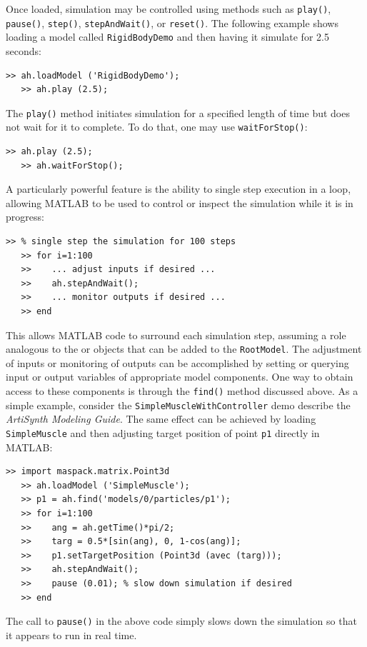 \documentclass{article}
\begin{document}
Once loaded, simulation may be controlled using methods such as {\tt play()},
{\tt pause()}, {\tt step()}, {\tt stepAndWait()}, or {\tt reset()}. The
following example shows loading a model called {\tt RigidBodyDemo} and then
having it simulate for 2.5 seconds:
%
\begin{lstlisting}[]
   >> ah.loadModel ('RigidBodyDemo');
   >> ah.play (2.5);
\end{lstlisting}
%
The {\tt play()} method initiates simulation for a specified length of time but
does not wait for it to complete. To do that, one may use {\tt waitForStop()}:
%
\begin{lstlisting}[]
   >> ah.play (2.5);
   >> ah.waitForStop();
\end{lstlisting}
%
A particularly powerful feature is the ability to single step
execution in a loop, allowing MATLAB to be used to control or inspect
the simulation while it is in progress:
%
\begin{lstlisting}[]
   >> % single step the simulation for 100 steps
   >> for i=1:100
   >>    ... adjust inputs if desired ...
   >>    ah.stepAndWait();
   >>    ... monitor outputs if desired ...
   >> end
\end{lstlisting}
%
This allows MATLAB code to surround each simulation step, assuming a
role analogous to the 
or  objects that can be
added to the {\tt RootModel}.  The adjustment of inputs or monitoring
of outputs can be accomplished by setting or querying input or output
variables of appropriate model components. One way to obtain access to
these components is through the {\tt find()} method discussed above.
As a simple example, consider the {\tt SimpleMuscleWithController}
demo describe the {\it ArtiSynth Modeling Guide}. The same effect
can be achieved by loading {\tt SimpleMuscle} and then adjusting
target position of point {\tt p1} directly in MATLAB:
%
\begin{lstlisting}[]
   >> import maspack.matrix.Point3d
   >> ah.loadModel ('SimpleMuscle');
   >> p1 = ah.find('models/0/particles/p1');
   >> for i=1:100
   >>    ang = ah.getTime()*pi/2;
   >>    targ = 0.5*[sin(ang), 0, 1-cos(ang)];
   >>    p1.setTargetPosition (Point3d (avec (targ)));
   >>    ah.stepAndWait();
   >>    pause (0.01); % slow down simulation if desired
   >> end
\end{lstlisting}
%
The call to {\tt pause()} in the above code simply slows down the
simulation so that it appears to run in real time.
\end{document}
